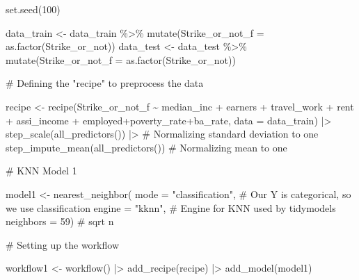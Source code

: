 \documentclass[
  letterpaper,
  DIV=11,
  numbers=noendperiod]{scrartcl}
\newenvironment{Shaded}{\begin{snugshade}}{\end{snugshade}}
\newcommand{\AttributeTok}[1]{\textcolor[rgb]{0.40,0.45,0.13}{#1}}
\newcommand{\CommentTok}[1]{\textcolor[rgb]{0.37,0.37,0.37}{#1}}
\newcommand{\DecValTok}[1]{\textcolor[rgb]{0.68,0.00,0.00}{#1}}
\newcommand{\FunctionTok}[1]{\textcolor[rgb]{0.28,0.35,0.67}{#1}}
\newcommand{\NormalTok}[1]{\textcolor[rgb]{0.00,0.23,0.31}{#1}}
\newcommand{\OtherTok}[1]{\textcolor[rgb]{0.00,0.23,0.31}{#1}}
\newcommand{\SpecialCharTok}[1]{\textcolor[rgb]{0.37,0.37,0.37}{#1}}
\newcommand{\StringTok}[1]{\textcolor[rgb]{0.13,0.47,0.30}{#1}}
\begin{document}
\begin{Shaded}
\begin{Highlighting}[]
\FunctionTok{set.seed}\NormalTok{(}\DecValTok{100}\NormalTok{)}

\NormalTok{data\_train }\OtherTok{\textless{}{-}}\NormalTok{ data\_train }\SpecialCharTok{\%\textgreater{}\%} \FunctionTok{mutate}\NormalTok{(}\AttributeTok{Strike\_or\_not\_f =} \FunctionTok{as.factor}\NormalTok{(Strike\_or\_not))}
\NormalTok{data\_test }\OtherTok{\textless{}{-}}\NormalTok{ data\_test }\SpecialCharTok{\%\textgreater{}\%} \FunctionTok{mutate}\NormalTok{(}\AttributeTok{Strike\_or\_not\_f =} \FunctionTok{as.factor}\NormalTok{(Strike\_or\_not))}

\CommentTok{\# Defining the "recipe" to preprocess the data}

\NormalTok{recipe }\OtherTok{\textless{}{-}} \FunctionTok{recipe}\NormalTok{(Strike\_or\_not\_f }\SpecialCharTok{\textasciitilde{}}\NormalTok{ median\_inc }\SpecialCharTok{+}\NormalTok{ earners }\SpecialCharTok{+}\NormalTok{ travel\_work }\SpecialCharTok{+}\NormalTok{ rent }\SpecialCharTok{+}
\NormalTok{          assi\_income }\SpecialCharTok{+}\NormalTok{ employed}\SpecialCharTok{+}\NormalTok{poverty\_rate}\SpecialCharTok{+}\NormalTok{ba\_rate, }
                 \AttributeTok{data =}\NormalTok{ data\_train) }\SpecialCharTok{|\textgreater{}}
  \FunctionTok{step\_scale}\NormalTok{(}\FunctionTok{all\_predictors}\NormalTok{()) }\SpecialCharTok{|\textgreater{}} \CommentTok{\# Normalizing standard deviation to one}
  \FunctionTok{step\_impute\_mean}\NormalTok{(}\FunctionTok{all\_predictors}\NormalTok{()) }\CommentTok{\# Normalizing mean to one}


\CommentTok{\# KNN Model 1}

\NormalTok{model1 }\OtherTok{\textless{}{-}} \FunctionTok{nearest\_neighbor}\NormalTok{(}
  \AttributeTok{mode =} \StringTok{"classification"}\NormalTok{, }\CommentTok{\# Our Y is categorical, so we use classification}
  \AttributeTok{engine =} \StringTok{"kknn"}\NormalTok{, }\CommentTok{\# Engine for KNN used by tidymodels}
  \AttributeTok{neighbors =} \DecValTok{59}\NormalTok{) }\CommentTok{\# sqrt n}


\CommentTok{\# Setting up the workflow}

\NormalTok{workflow1 }\OtherTok{\textless{}{-}} \FunctionTok{workflow}\NormalTok{() }\SpecialCharTok{|\textgreater{}}
  \FunctionTok{add\_recipe}\NormalTok{(recipe) }\SpecialCharTok{|\textgreater{}}
  \FunctionTok{add\_model}\NormalTok{(model1)}



\end{Highlighting}
\end{Shaded}
\end{document}
